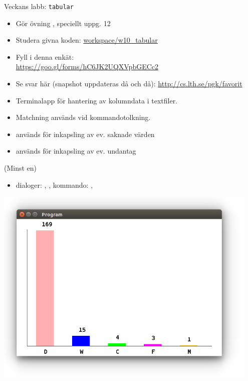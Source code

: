 \begin{SlideExtra}{Veckans labb: \texttt{tabular}}\SlideFontTiny
\hspace{-2em}\begin{minipage}{0.7\textwidth}
\vspace{0.25em}
\begin{itemize}
\item Gör övning , speciellt uppg. 12
\item Studera givna koden: {\SlideFontTiny \href{https://github.com/lunduniversity/introprog/tree/master/workspace/w13_tabular}{workspace/w10\_tabular}}
\item Fyll i denna enkät:
\\{\SlideFontTiny \url{https://goo.gl/forms/hC6JK2UQXVpbGECc2}}
\item Se svar här (snapshot uppdateras då och då): \url{http://cs.lth.se/pgk/favorit}
\end{itemize}

\begin{itemize}
\item Terminalapp för hantering av kolumndata i textfiler.
\item Matchning används vid kommandotolkning.
\item {} används för inkapsling av ev. saknade värden
\item {} används för inkapsling av ev. undantag
\end{itemize}
 (Minst en)
\begin{itemize}
\item dialoger: , , kommando: , 
\end{itemize}
\end{minipage}
\hfill\begin{minipage}{0.3\textwidth}
\centering
\includegraphics[width=0.95\textwidth]{../img/survey/bar}


\end{minipage}
\end{SlideExtra}
